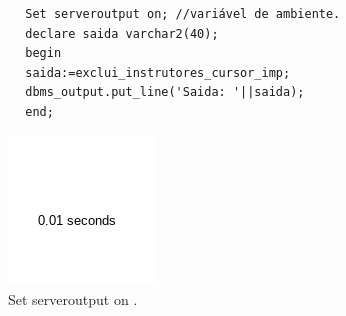 \documentclass[
article,			%
11pt,				%
oneside,			%
a4paper,			%
english,			%
brazil,				%
sumario=tradicional
]{abntex2}
\begin{document}
\begin{enumerate}
		
			
														\begin{verbatim}
		Set serveroutput on; //variável de ambiente.
		declare saida varchar2(40);
		begin
		saida:=exclui_instrutores_cursor_imp;
		dbms_output.put_line('Saida: '||saida);
		end;
			\end{verbatim}
				\begin{center}
				\begin{figure}[H]
					\centering
					\includegraphics[scale=0.5]{./imagens/37.png}
					\caption{	Set serveroutput on .}
					\label{rota-1}
				\end{figure}
			\end{center}
		

	\end{enumerate}				
			
\end{document}
